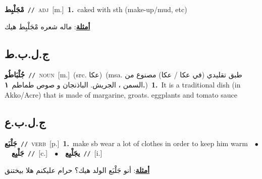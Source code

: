 \documentclass[10pt,a4paper,twoside]{article} %
\begin{document}
\begin{multicols}{2}
{\setlength\topsep{0pt}\textbf{\foreignlanguage{arabic}{مْجَلْبِط}}\ {\color{gray}\texttt{//}\color{black}}\ \textsc{adj}\ [m.]\ \textbf{1.}~caked with sth (make-up/mud, etc)\  \begin{flushright}\color{gray}\foreignlanguage{arabic}{\textbf{\underline{\foreignlanguage{arabic}{أمثلة}}}: ماله شعره مْجَلْبِط هيك}\end{flushright}\color{black}} \vspace{2mm}

\vspace{-3mm}
\subsection*{\color{blue}\foreignlanguage{arabic}{ج.ل.ب.ط}\color{blue}{ (ntws)}} 

{\setlength\topsep{0pt}\textbf{\foreignlanguage{arabic}{جُلْبَاطُو}}\ {\color{gray}\texttt{//}\color{black}}\ \textsc{noun}\ [m.]\ (src. \color{gray}\foreignlanguage{arabic}{عكا}\color{black})\ \color{gray}(msa. \foreignlanguage{arabic}{طبق تقليدي (في عكا / عكا) مصنوع من السمن ، الجريش. الباذنجان و صوص طماطم}~\foreignlanguage{arabic}{\textbf{١.}})\color{black}\ \textbf{1.}~It is a traditional dish (in Akko/Acre) that is made of margarine, groats. eggplants and tomato sauce\ } \vspace{2mm}

\vspace{-3mm}
\subsection*{\color{blue}\foreignlanguage{arabic}{ج.ل.ب.ع}\color{blue}{}} 

{\setlength\topsep{0pt}\textbf{\foreignlanguage{arabic}{جَلْبَع}}\ {\color{gray}\texttt{//}\color{black}}\ \textsc{verb}\ [p.]\ \textbf{1.}~make sb wear a lot of clothes in order to keep him warm\ \ $\bullet$\ \ \setlength\topsep{0pt}\textbf{\foreignlanguage{arabic}{جَلْبِع}}\ {\color{gray}\texttt{//}\color{black}}\ [c.]\ \ $\bullet$\ \ \setlength\topsep{0pt}\textbf{\foreignlanguage{arabic}{يجَلْبِع}}\ {\color{gray}\texttt{//}\color{black}}\ [i.]\  \begin{flushright}\color{gray}\foreignlanguage{arabic}{\textbf{\underline{\foreignlanguage{arabic}{أمثلة}}}: أنو جَلْبَع الولد هيك؟ حرام عليكنم هلا بيختنق}\end{flushright}\color{black}} \vspace{2mm}


\end{multicols}
\end{document}
